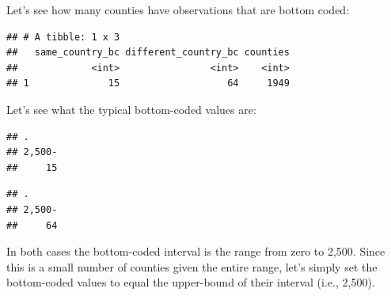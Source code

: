 \documentclass[]{book}
\newenvironment{Shaded}{\begin{snugshade}}{\end{snugshade}}
\newcommand{\KeywordTok}[1]{\textcolor[rgb]{0.13,0.29,0.53}{\textbf{{#1}}}}
\newcommand{\DataTypeTok}[1]{\textcolor[rgb]{0.13,0.29,0.53}{{#1}}}
\newcommand{\StringTok}[1]{\textcolor[rgb]{0.31,0.60,0.02}{{#1}}}
\newcommand{\NormalTok}[1]{{#1}}
\theoremstyle{definition}
\theoremstyle{definition}
\theoremstyle{remark}
\begin{document}
Let's see how many counties have observations that are bottom coded:

\begin{Shaded}
\end{Shaded}

\begin{verbatim}
## # A tibble: 1 x 3
##   same_country_bc different_country_bc counties
##             <int>                <int>    <int>
## 1              15                   64     1949
\end{verbatim}

Let's see what the typical bottom-coded values are:

\begin{Shaded}
\end{Shaded}

\begin{verbatim}
## .
## 2,500- 
##     15
\end{verbatim}

\begin{Shaded}
\end{Shaded}

\begin{verbatim}
## .
## 2,500- 
##     64
\end{verbatim}

In both cases the bottom-coded interval is the range from zero to 2,500.
Since this is a small number of counties given the entire range, let's
simply set the bottom-coded values to equal the upper-bound of their
interval (i.e., 2,500).
\end{document}
